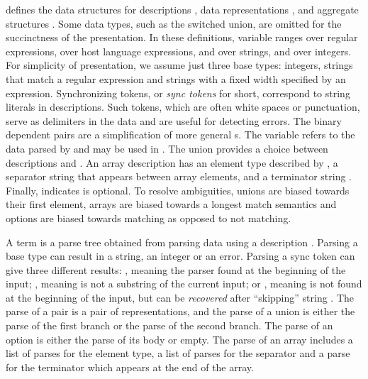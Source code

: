  defines
the data structures for descriptions , data
representations , and aggregate structures .
Some data types, such as the switched union, are omitted for the succinctness
of the presentation.
In these definitions,  variable  ranges over regular expressions,
 over host language expressions,
 and  over strings, and  over integers.
For simplicity of presentation, we assume just three base types: 
integers, strings that match a regular expression and strings with a
fixed width specified by an expression. Synchronizing
tokens, or {\em sync tokens} for short, correspond to string literals
in \pads{} descriptions.  Such tokens, which are often
white spaces or punctuation,
serve as delimiters in the data and are useful for detecting
errors. The binary dependent pairs  are
a simplification of \pads{} more general s. 
The variable  refers to the data parsed by 
and may be used in . The union 
provides a choice between descriptions  and .
An array description
 has an element type described by , a separator
string  that appears between array elements, and a
terminator string . Finally,  indicates  is 
optional.  To resolve ambiguities, unions are
biased towards their first element, arrays are biased towards a longest match
semantics and options are biased towards matching as opposed to not matching.

A term  is a parse tree obtained from parsing 
data using a description .  Parsing a base type can result in a
string, an integer or an error.  Parsing a sync token
 can give three different results: , meaning the
parser found  at the beginning of the input; , meaning
 is not a substring of the current input; or ,
meaning  is not found at the beginning of the input, but
can be {\em recovered} after ``skipping'' string .  The parse
of a pair is a pair of representations, and the parse of a union is
either the parse of the first branch or the parse of the second
branch. The parse of an option is either the parse of its body or  empty.
The parse of an array includes a list of parses for the
element type, a list of parses for the separator and a parse for the
terminator which appears at the end of the array.


